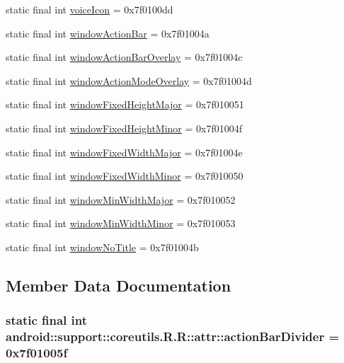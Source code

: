 \begin{CompactItemize}
\item 
static final int \hyperlink{classandroid_1_1support_1_1coreutils_1_1_r_1_1attr_fd395f9a3b77964dc2e3f860dcbf7456}{voiceIcon} = 0x7f0100dd
\item 
static final int \hyperlink{classandroid_1_1support_1_1coreutils_1_1_r_1_1attr_20039cdb8c02999af22b475b8dc3b10b}{windowActionBar} = 0x7f01004a
\item 
static final int \hyperlink{classandroid_1_1support_1_1coreutils_1_1_r_1_1attr_75779fd3571790091c879b638d1d8a89}{windowActionBarOverlay} = 0x7f01004c
\item 
static final int \hyperlink{classandroid_1_1support_1_1coreutils_1_1_r_1_1attr_a034f575b5e530edcb037e32fffae647}{windowActionModeOverlay} = 0x7f01004d
\item 
static final int \hyperlink{classandroid_1_1support_1_1coreutils_1_1_r_1_1attr_0f1059301666c333223e37ee595ef9fc}{windowFixedHeightMajor} = 0x7f010051
\item 
static final int \hyperlink{classandroid_1_1support_1_1coreutils_1_1_r_1_1attr_0d83b2b7061cd1ad506627cc84dcc399}{windowFixedHeightMinor} = 0x7f01004f
\item 
static final int \hyperlink{classandroid_1_1support_1_1coreutils_1_1_r_1_1attr_a97d85e5e4dd4bdab52973e20638ab59}{windowFixedWidthMajor} = 0x7f01004e
\item 
static final int \hyperlink{classandroid_1_1support_1_1coreutils_1_1_r_1_1attr_854d48624e4572ec802a1f8dc353ac65}{windowFixedWidthMinor} = 0x7f010050
\item 
static final int \hyperlink{classandroid_1_1support_1_1coreutils_1_1_r_1_1attr_e6339e8edfe091617ca075f3101f10bd}{windowMinWidthMajor} = 0x7f010052
\item 
static final int \hyperlink{classandroid_1_1support_1_1coreutils_1_1_r_1_1attr_c05333d4313c289b443cc29cdbbda21d}{windowMinWidthMinor} = 0x7f010053
\item 
static final int \hyperlink{classandroid_1_1support_1_1coreutils_1_1_r_1_1attr_8034035bd944dc81a92b7f922d2894dc}{windowNoTitle} = 0x7f01004b
\end{CompactItemize}


\subsection{Member Data Documentation}
\hypertarget{classandroid_1_1support_1_1coreutils_1_1_r_1_1attr_fb0e6a2d5fab12cfcd720f14a0f9bc63}{
\subsubsection[{actionBarDivider}]{\setlength{\rightskip}{0pt plus 5cm}static final int android::support::coreutils.R.R::attr::actionBarDivider = 0x7f01005f}}
\label{classandroid_1_1support_1_1coreutils_1_1_r_1_1attr_fb0e6a2d5fab12cfcd720f14a0f9bc63}


